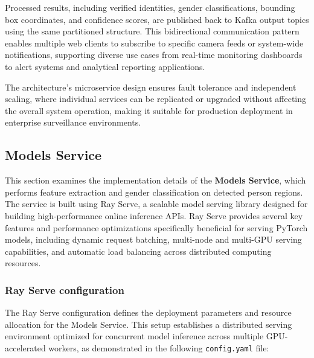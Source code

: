 Processed results, including verified identities, gender classifications, bounding box coordinates, and confidence scores, are published back to Kafka output topics using the same partitioned structure. This bidirectional communication pattern enables multiple web clients to subscribe to specific camera feeds or system-wide notifications, supporting diverse use cases from real-time monitoring dashboards to alert systems and analytical reporting applications.

The architecture's microservice design ensures fault tolerance and independent scaling, where individual services can be replicated or upgraded without affecting the overall system operation, making it suitable for production deployment in enterprise surveillance environments.


\subsection{Models Service}

This section examines the implementation details of the \textbf{Models Service}, which performs feature extraction and gender classification on detected person regions. The service is built using Ray Serve, a scalable model serving library designed for building high-performance online inference APIs. Ray Serve provides several key features and performance optimizations specifically beneficial for serving PyTorch models, including dynamic request batching, multi-node and multi-GPU serving capabilities, and automatic load balancing across distributed computing resources.

\subsubsection{Ray Serve configuration}

The Ray Serve configuration defines the deployment parameters and resource allocation for the Models Service. This setup establishes a distributed serving environment optimized for concurrent model inference across multiple GPU-accelerated workers, as demonstrated in the following \texttt{config.yaml} file:

